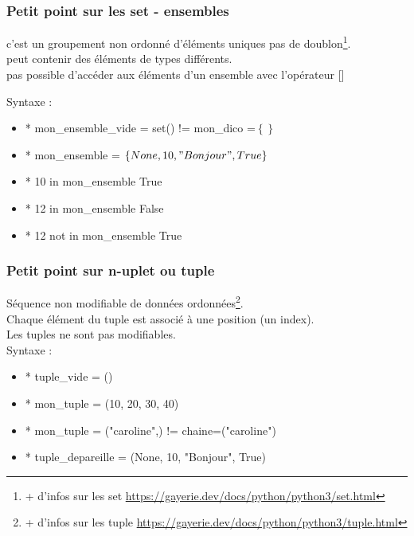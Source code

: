 \begin{frame}
  \frametitle{Petit point sur les set - ensembles}
   c'est un groupement non ordonné d’éléments uniques  pas de doublon\footnote{+ d'infos sur les set \url{https://gayerie.dev/docs/python/python3/set.html}}.\\
   peut contenir des éléments de types différents.\\
   pas possible d’accéder aux éléments d’un ensemble avec l’opérateur [] 
  
  Syntaxe :
  
  \begin{itemize}
\item*  mon\_ensemble\_vide = set() !=  mon\_dico =$\left\{\right\}$
\item* mon\_ensemble = $\left\{None, 10, "Bonjour",True \right\}$
\item* 10 in mon\_ensemble  True
\item* 12 in mon\_ensemble  False
\item* 12 not in mon\_ensemble  True
\end{itemize}
\end{frame}

\begin{frame}
  \frametitle{Petit point sur n-uplet ou tuple}
  
  Séquence non modifiable de données ordonnées\footnote{+ d'infos sur les tuple \url{https://gayerie.dev/docs/python/python3/tuple.html}}. \\
  Chaque élément du tuple est associé à une position (un index).\\ 
  Les tuples ne sont pas modifiables.\\ 
 
 Syntaxe :
 
   \begin{itemize}
   
\item*  tuple\_vide = ()
\item* mon\_tuple = (10, 20, 30, 40)
\item*  mon\_tuple = ("caroline",) != chaine=("caroline") 
\item* tuple\_depareille = (None, 10, "Bonjour", True)
 
\end{itemize}
\end{frame}

